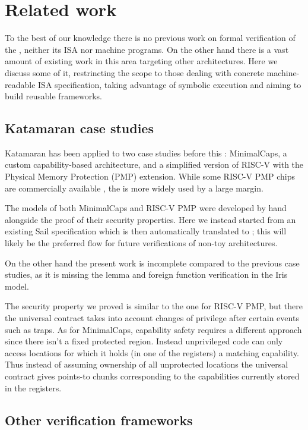 \chapter{Related work}
\label{ch:related-work}

To the best of our knowledge there is no previous work on formal verification of the \msp, neither its ISA nor machine programs. On the other hand there is a vast amount of existing work in this area targeting other architectures. Here we discuss some of it, restrincting the scope to those dealing with concrete machine-readable ISA specification, taking advantage of symbolic execution and aiming to build reusable frameworks.

\section{Katamaran case studies}

Katamaran has been applied to two case studies before this \cite{Huyghebaert2023}: MinimalCaps, a custom capability-based architecture, and a simplified version of RISC-V with the Physical Memory Protection (PMP) extension. While some RISC-V PMP chips are commercially available \cite{XuanTie}, the \msp is more widely used by a large margin.

The \usail models of both MinimalCaps and RISC-V PMP were developed by hand alongside the proof of their security properties. Here we instead started from an existing Sail specification which is then automatically translated to \usail; this will likely be the preferred flow for future verifications of non-toy architectures.

On the other hand the present work is incomplete compared to the previous case studies, as it is missing the lemma and foreign function verification in the Iris model.

The security property we proved is similar to the one for RISC-V PMP, but there the universal contract takes into account changes of privilege after certain events such as traps. As for MinimalCaps, capability safety requires a different approach since there isn't a fixed protected region. Instead unprivileged code can only access locations for which it holds (in one of the registers) a matching capability. Thus instead of assuming ownership of all unprotected locations the universal contract gives points-to chunks corresponding to the capabilities currently stored in the registers.

\section{Other verification frameworks}

